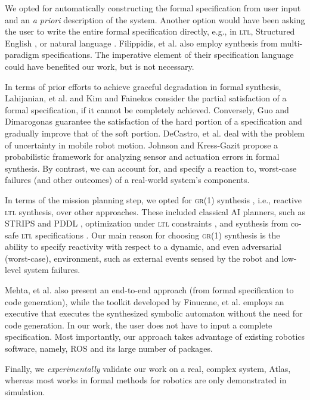 
We opted for automatically constructing the formal specification from user input and an \emph{a priori} description of the system.
Another option would have been asking the user to write the entire formal specification directly, e.g., in \textsc{ltl}, Structured English \cite{JFRKG2012ICRA}, or natural language \cite{Lignos2015AURO}.
Filippidis, et al. \cite{Filippidis2015SYNT} also employ synthesis from multi-paradigm specifications.
The imperative element of their specification language could have benefited our work, but is not necessary.

In terms of prior efforts to achieve graceful degradation in formal synthesis, Lahijanian, et al. \cite{Kavraki2015AAAI} and Kim and Fainekos \cite{Fainekos2014ICRA} consider the partial satisfaction of a formal specification, if it cannot be  completely achieved.
Conversely, Guo and Dimarogonas \cite{Dimos2014ICRA} guarantee the satisfaction of the hard portion of a specification and gradually improve that of the soft portion.
DeCastro, et al. \cite{Jon2015ICRA} deal with the problem of uncertainty in mobile robot motion.
Johnson and Kress-Gazit \cite{Ben2015IJRR} propose a probabilistic framework for analyzing sensor and actuation errors in formal synthesis.
By contrast, we can account for, and specify a reaction to, worst-case failures (and other outcomes) of a real-world system's components.

In terms of the mission planning step, we opted for \textsc{gr(1)} synthesis \cite{Bloem2012GR1}, i.e., reactive \textsc{ltl} synthesis, over other approaches.
These included classical AI planners, such as STRIPS \cite{STRIPS1971AI} and PDDL \cite{PDDL1998TR}, optimization under \textsc{ltl} constraints \cite{Wolff2014ICRA}, and synthesis from co-safe \textsc{ltl} specifications \cite{Kavraki2015AAAI, Kavraki2015ICRA, Belta2014TAC}.
Our main reason for choosing \textsc{gr(1)} synthesis is the ability to specify reactivity with respect to a dynamic, and even adversarial (worst-case), environment, such as external events sensed by the robot and low-level system failures.

Mehta, et al.\cite{Ankur2015ISRR} also present an end-to-end approach (from formal specification to code generation), while the toolkit developed by Finucane, et al. \cite{Finucane2010IROS} employs an executive that executes the synthesized symbolic automaton without the need for code generation.
In our work, the user does not have to input a complete specification.
Most importantly, our approach takes advantage of existing robotics software, namely, ROS \cite{ROS} and its large number of packages.

Finally, we \emph{experimentally} validate our work on a real, complex system, Atlas, whereas most works in formal methods for robotics are only demonstrated in simulation.

